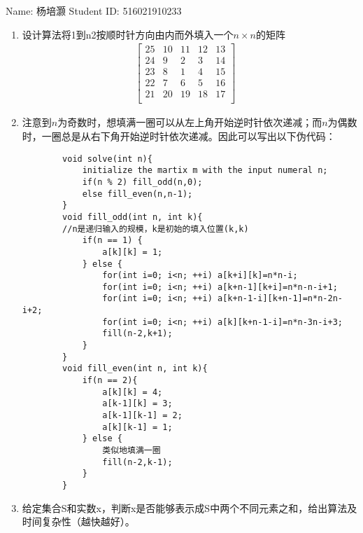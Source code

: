 \documentclass[12pt,a4paper]{article}
\makeatletter
\newtheorem*{solution}{Solution}
\theoremstyle{definition}
\renewenvironment{solution}[1][Solution] {\par\pushQED{\qed}\normalfont\topsep6\p@\@plus6\p@\relax\trivlist\item[\hskip\labelsep\bfseries#1\@addpunct{.}]\ignorespaces}{\popQED\endtrivlist\@endpefalse} \makeatother
\makeatother
\begin{document}
\noindent

\noindent{}
\begin{center}

\footnotesize{\color{black} Name: 杨培灏  \quad Student ID: 516021910233}
\end{center}

\begin{enumerate}

\item 设计算法将1到n2按顺时针方向由内而外填入一个$n \times n$的矩阵
\begin{gather*}
	\begin{bmatrix}
	25 & 10 & 11 & 12 & 13\\
	24 & 9 & 2 & 3 & 14\\
	23 & 8 & 1 & 4 & 15\\
	22 & 7 & 6 & 5 & 16\\
	21 & 20 & 19 & 18 & 17\\
	\end{bmatrix}\quad
\end{gather*}
\begin{solution}
	注意到$n$为奇数时，想填满一圈可以从左上角开始逆时针依次递减；而$n$为偶数时，一圈总是从右下角开始逆时针依次递减。因此可以写出以下伪代码：
	\begin{lstlisting}
		void solve(int n){
			initialize the martix m with the input numeral n;
			if(n % 2) fill_odd(n,0);
			else fill_even(n,n-1);
		}
		void fill_odd(int n, int k){
		//n是递归输入的规模，k是初始的填入位置(k,k)
			if(n == 1) {
				a[k][k] = 1;
			} else {
				for(int i=0; i<n; ++i) a[k+i][k]=n*n-i;
				for(int i=0; i<n; ++i) a[k+n-1][k+i]=n*n-n-i+1;
				for(int i=0; i<n; ++i) a[k+n-1-i][k+n-1]=n*n-2n-i+2;
				for(int i=0; i<n; ++i) a[k][k+n-1-i]=n*n-3n-i+3;
				fill(n-2,k+1);
			}
		}
		void fill_even(int n, int k){
			if(n == 2){
				a[k][k] = 4;
				a[k-1][k] = 3;
				a[k-1][k-1] = 2;
				a[k][k-1] = 1;
			} else {
				类似地填满一圈
				fill(n-2,k-1);
			}
		}
	\end{lstlisting}
\end{solution}


\item 给定集合S和实数x，判断x是否能够表示成S中两个不同元素之和，给出算法及时间复杂性（越快越好）。


\end{enumerate}
\end{document}
